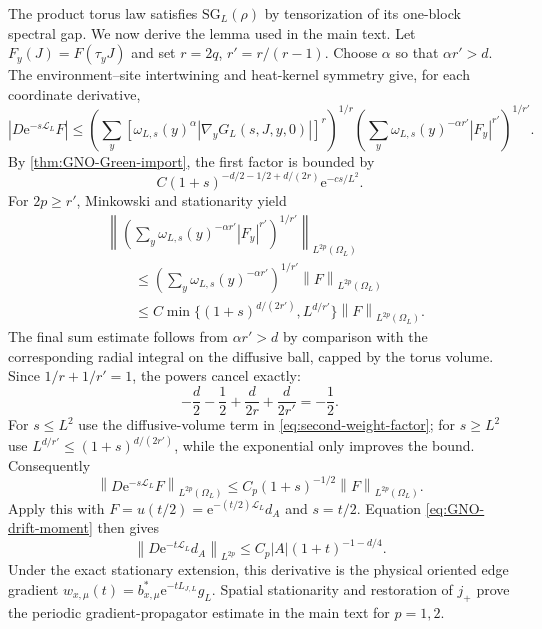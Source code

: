 \documentclass[11pt]{article}
\theoremstyle{definition}
\theoremstyle{remark}
\newcommand{\e}{\mathrm e}
\newcommand{\norm}[1]{\left\lVert #1\right\rVert}
\newcommand{\abs}[1]{\left\lvert #1\right\rvert}
\begin{document}
The product torus law satisfies $\mathrm{SG}_L(\rho)$ by tensorization of its one-block spectral gap.  We now derive the lemma used in the main text.  Let $F_y(J)=F(\tau_yJ)$ and set $r=2q$, $r'=r/(r-1)$.  Choose $\alpha$ so that $\alpha r'>d$.  The environment--site intertwining and heat-kernel symmetry give, for each coordinate derivative,
\begin{equation}
 \abs{D\e^{-s\mathscr L_L}F}
 \le
 \left(\sum_y[\omega_{L,s}(y)^\alpha\abs{\nabla_yG_L(s,J,y,0)}]^r\right)^{1/r}
 \left(\sum_y\omega_{L,s}(y)^{-\alpha r'}\abs{F_y}^{r'}\right)^{1/r'}.
 \label{eq:weighted-Holder-full}
\end{equation}
By \cref{thm:GNO-Green-import}, the first factor is bounded by
\begin{equation}
 C(1+s)^{-d/2-1/2+d/(2r)}\e^{-cs/L^2}.
 \label{eq:first-Green-factor}
\end{equation}
For $2p\ge r'$, Minkowski and stationarity yield
\begin{align}
 &\left\|\left(\sum_y\omega_{L,s}(y)^{-\alpha r'}\abs{F_y}^{r'}\right)^{1/r'}\right\|_{L^{2p}(\Omega_L)}\\
 &\qquad\le
 \left(\sum_y\omega_{L,s}(y)^{-\alpha r'}\right)^{1/r'}\norm F_{L^{2p}(\Omega_L)}\\
 &\qquad\le C\min\{(1+s)^{d/(2r')},L^{d/r'}\}\norm F_{L^{2p}(\Omega_L)}.
 \label{eq:second-weight-factor}
\end{align}
The final sum estimate follows from $\alpha r'>d$ by comparison with the corresponding radial integral on the diffusive ball, capped by the torus volume.  Since $1/r+1/r'=1$, the powers cancel exactly:
\[
 -\frac d2-\frac12+\frac d{2r}+\frac d{2r'}=-\frac12.
\]
For $s\le L^2$ use the diffusive-volume term in \eqref{eq:second-weight-factor}; for $s\ge L^2$ use $L^{d/r'}\le(1+s)^{d/(2r')}$, while the exponential only improves the bound.  Consequently
\begin{equation}
 \norm{D\e^{-s\mathscr L_L}F}_{L^{2p}(\Omega_L)}
 \le C_p(1+s)^{-1/2}\norm F_{L^{2p}(\Omega_L)}.
 \label{eq:gradient-semigroup-upgrade}
\end{equation}
Apply this with $F=u(t/2)=\e^{-(t/2)\mathscr L_L}d_A$ and $s=t/2$.  Equation \eqref{eq:GNO-drift-moment} then gives
\begin{equation}
 \norm{D\e^{-t\mathscr L_L}d_A}_{L^{2p}}
 \le C_p\abs A(1+t)^{-1-d/4}.
\end{equation}
Under the exact stationary extension, this derivative is the physical oriented edge gradient $w_{x,\mu}(t)=b_{x,\mu}^*\e^{-tL_{J,L}}g_L$.  Spatial stationarity and restoration of $j_+$ prove the periodic gradient-propagator estimate in the main text for $p=1,2$.
\end{document}
